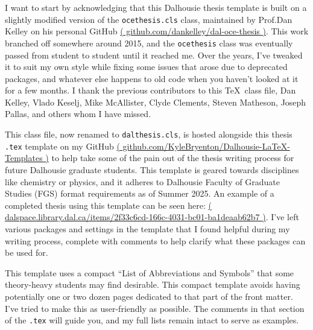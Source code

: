 \documentclass[12pt,letterpaper,oneside,titlepage,final]{dalthesis}
\numberwithin{equation}{section}
\begin{document}
I want to start by acknowledging that this Dalhousie thesis template is built on a slightly modified version of the \texttt{ocethesis.cls} class, maintained by Prof.\@ Dan Kelley on his personal GitHub \href{https://github.com/dankelley/dal-oce-thesis}{( github.com/dankelley/dal-oce-thesis )}. This work branched off somewhere around 2015, and the \texttt{ocethesis} class was eventually passed from student to student until it reached me. Over the years, I've tweaked it to suit my own style while fixing some issues that arose due to deprecated packages, and whatever else happens to old code when you haven't looked at it for a few months. I thank the previous contributors to this \TeX\ class file, Dan Kelley, Vlado Keselj, Mike McAllister, Clyde Clements, Steven Matheson, Joseph Pallas, and others whom I have missed. 

This class file, now renamed to \texttt{dalthesis.cls}, is hosted alongside this thesis \texttt{.tex} template on my GitHub \href{https://github.com/KyleBryenton/Dalhousie-LaTeX-Templates}{( github.com/KyleBryenton/Dalhousie-LaTeX-Templates )} to help take some of the pain out of the thesis writing process for future Dalhousie graduate students. This template is geared towards disciplines like chemistry or physics, and it adheres to Dalhousie Faculty of Graduate Studies (FGS) format requirements as of Summer 2025. An example of a completed thesis using this template can be seen here: \href{https://dalspace.library.dal.ca/items/2f33c6cd-166c-4031-bc01-ba1deaab62b7}{( dalspace.library.dal.ca/items/2f33c6cd-166c-4031-bc01-ba1deaab62b7 )}. I've left various packages and settings in the template that I found helpful during my writing process, complete with comments to help clarify what these packages can be used for.

This template uses a compact ``List of Abbreviations and Symbols'' that some theory-heavy students may find desirable. This compact template avoids having potentially one or two dozen pages dedicated to that part of the front matter. I've tried to make this as user-friendly as possible. The comments in that section of the \texttt{.tex} will guide you, and my full lists remain intact to serve as examples.\\
\end{document}
